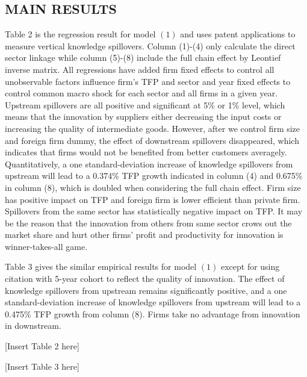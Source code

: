 \documentclass[12pt]{article}%
\begin{document}
\begin{CJK*}{GBK}{fs}
\subsection{MAIN RESULTS}
Table 2 is the regression result for model $(1)$ and uses patent applications to measure vertical knowledge spillovers. Column (1)-(4) only calculate the direct sector linkage while column (5)-(8) include the full chain effect by Leontief inverse matrix. All regressions have added firm fixed effects to control all unobservable factors influence firm's TFP and sector and year fixed effects to control common macro shock for each sector and all firms in a given year.  Upstream spillovers are all positive and significant at 5\% or 1\% level, which means that the innovation by suppliers either decreasing the input costs or increasing the quality of intermediate goods. However, after we control firm size and foreign firm dummy, the effect of downstream spillovers disappeared, which indicates that firms would not be benefited from better customers averagely. Quantitatively, a one standard-deviation increase of knowledge spillovers from upstream will lead to a 0.374\% TFP growth indicated in column (4) and 0.675\% in column (8), which is doubled when considering the full chain effect. Firm size has positive impact on TFP and foreign firm is lower efficient than private firm. Spillovers from the same sector has statistically negative impact on TFP. It may be the reason that the innovation from others from same sector crows out the market share and hurt other firms' profit and productivity for innovation is winner-takes-all game. \par
Table 3 gives the similar empirical results for model $(1)$ except for using citation with 5-year cohort to reflect the quality of innovation. The effect of knowledge spillovers from upstream remains significantly positive, and a one standard-deviation increase of knowledge spillovers from upstream will lead to a 0.475\% TFP growth from column (8). Firms take no advantage from innovation in downstream.

\begin{center}
  [Insert Table 2 here]
\end{center}
\begin{center}
  [Insert Table 3 here]
\end{center}


\end{CJK*}
\end{document}
